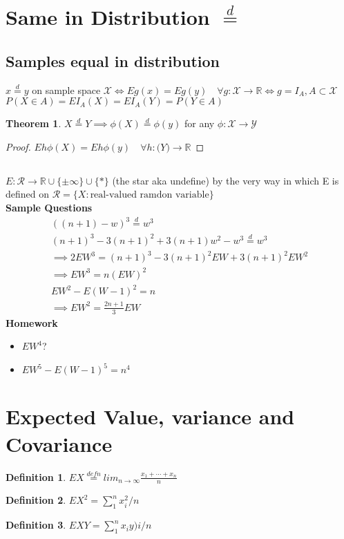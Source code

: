 \documentclass{article}
\theoremstyle{definition}
\newtheorem{definition}{Definition}[section]
\theoremstyle{thrm}
\newtheorem{thrm}{Theorem}[section]
\theoremstyle{lma}
\theoremstyle{ppst}
\theoremstyle{crlr}
\begin{document}
\section{Same in Distribution $\stackrel{d}{=}$}


\subsection{Samples equal in distribution}
$x\stackrel{d}{=}y $ on sample space $\mathscr{X} \iff Eg(x) = Eg(y)\quad \forall g:\mathscr{X} \to \mathbb{R} \iff g=I_A, A\subset \mathscr{X}$\\
$P(X\in A) = EI_A(X) = EI_A(Y) = P(Y\in A)$
\begin{thrm}
	$X\stackrel{d}{=}Y \implies \phi(X)\stackrel{d}{=}\phi(y)$ for any $\phi: \mathscr{X} \to \mathscr{Y}$
\end{thrm}
\begin{proof}
	$Eh \phi(X) = Eh \phi(y)\quad \forall h: \mathscr(Y)\to \mathbb{R}$
\end{proof}
\subsection{}
$E:\mathscr{R}\to \mathbb{R}\cup \{\pm \infty\}\cup\{*\}$ (the star aka undefine) by the very way in which  E is defined on $\mathscr{R} =\{X : \text{real-valued ramdon variable} \}$\\
\textbf{Sample Questions}
\begin{align*}
	((n+1)-w)^3\stackrel{d}{=}w^3\\
	(n+1)^3-3(n+1)^2+3(n+1)w^2-w^3\stackrel{d}{=}w^3\\
	\implies 2EW^3 = (n+1)^3-3(n+1)^2EW+3(n+1)^2EW^2\\
	\implies EW^3 = n(EW)^2\\
	EW^2-E(W-1)^2 = n\\
	\implies EW^2 = \frac{2n+1}{3}EW
\end{align*}
\textbf{Homework}
\begin{itemize}
	\item $EW^4$?
	\item $EW^5-E(W-1)^5 = n^4$
\end{itemize}

\section{Expected Value, variance and Covariance}
\begin{definition}
	$EX \stackrel{defn}{=} lim_{n\to \infty} \frac{x_1+\cdots + x_n}{n}$
\end{definition}
\begin{definition}
	$EX^2 = \sum_1^n x_i^2/n$
\end{definition}
\begin{definition}
	$EXY = \sum_1^n x_iy)i/n$
\end{definition}
\end{document}
